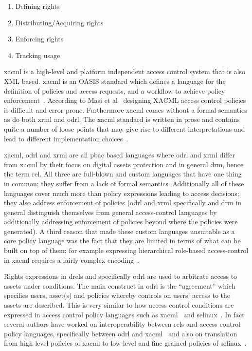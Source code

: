 \documentclass[runningheads,a4paper]{llncs}
\begin{document}
\begin{enumerate}
  \item Defining rights 
  \item Distributing/Acquiring rights 
  \item Enforcing rights 
  \item Tracking usage
\end{enumerate}

\ac{xacml} is a high-level and platform independent access control system that is also XML based. \ac{xacml} is an OASIS standard which defines a language for the definition of policies and access requests, and a workflow to achieve policy enforcement~\cite{DBLP:conf/essos/MasiPT12}. According to Masi et al~\cite{DBLP:conf/essos/MasiPT12} designing XACML access control policies is difficult and error prone. Furthermore \ac{xacml} comes without a formal semantics as do both \ac{xrml} and \ac{odrl}. The \ac{xacml} standard is written in prose and contains quite a number of loose points that may give rise to different interpretations and lead to different implementation choices~\cite{DBLP:conf/essos/MasiPT12}.

\ac{xacml}, \ac{odrl} and \ac{xrml} are all \ac{pbac} based languages where \ac{odrl} and \ac{xrml} differ from \ac{xacml} by their focus on digital assets protection and in general \ac{drm}, hence the term \ac{rel}. All three are full-blown and custom languages that have one thing in common; they suffer from a lack of formal semantics. Additionally all of these languages cover much more than policy expressions leading to access decisions; they also address enforcement of policies (\ac{odrl} and \ac{xrml} specifically and \ac{drm} in general distinguish themselves from general access-control languages by additionally addressing enforcement of policies beyond where the policies were generated). A third reason that made these custom languages unsuitable as a core policy language was the fact that they are limited in terms of what can be built on top of them; for example expressing hierarchical role-based access-control  in \ac{xacml} requires a fairly complex encoding~\cite{Tschantz}.

Rights expressions in \ac{drel}s and specifically \ac{odrl} are used to arbitrate access to assets under conditions. The main construct in \ac{odrl} is the ``agreement'' which specifies users, asset(s) and policies whereby controls on users' access to the assets are described. This is very similar to how access control conditions are expressed in access control policy languages such as \ac{xacml}~\cite{xacml} and \ac{selinux}~\cite{selinux}. In fact several authors have worked on interoperability between \ac{rel}s and access control policy languages, specifically between \ac{odrl} and \ac{xacml}~\cite{prados2005interoperability,maronas2009architecture} and also on translation from high level policies of \ac{xacml} to low-level and fine grained policies of \ac{selinux}~\cite{alam2008usage}. 
\end{document}
